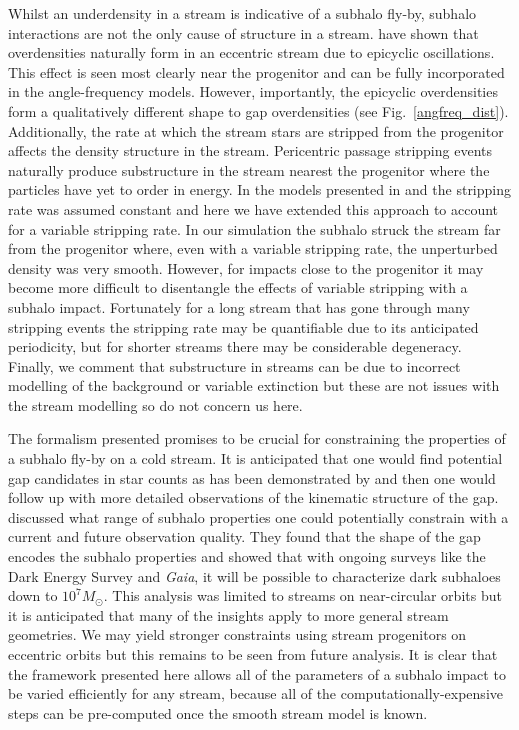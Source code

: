 \documentclass[useAMS,usenatbib,fleqn,a4paper]{mn2e}
\begin{document}
Whilst an underdensity in a stream is indicative of a subhalo fly-by, subhalo interactions are not the only cause of structure in a stream. \cite{Kuepper2010} have shown that overdensities naturally form in an eccentric stream due to epicyclic oscillations. This effect is seen most clearly near the progenitor and can be fully incorporated in the angle-frequency models. However, importantly, the epicyclic overdensities form a qualitatively different shape to gap overdensities (see Fig.~\ref{angfreq_dist}). Additionally, the rate at which the stream stars are stripped from the progenitor affects the density structure in the stream. Pericentric passage stripping events naturally produce substructure in the stream nearest the progenitor where the particles have yet to order in energy. In the models presented in \cite{Bovy2014} and \cite{Sanders2014} the stripping rate was assumed constant and here we have extended this approach to account for a variable stripping rate. In our simulation the subhalo struck the stream far from the progenitor where, even with a variable stripping rate, the unperturbed density was very smooth. However, for impacts close to the progenitor it may become more difficult to disentangle the effects of variable stripping with a subhalo impact. Fortunately for a long stream that has gone through many stripping events the stripping rate may be quantifiable due to its anticipated periodicity, but for shorter streams there may be considerable degeneracy. Finally, we comment that substructure in streams can be due to incorrect modelling of the background or variable extinction but these are not issues with the stream modelling so do not concern us here.

The formalism presented promises to be crucial for constraining the properties of a subhalo fly-by on a cold stream. It is anticipated that one would find potential gap candidates in star counts as has been demonstrated by \cite{CarlbergGD12013} and then one would follow up with more detailed observations of the kinematic structure of the gap. \cite{ErkalBelokurov2015b} discussed what range of subhalo properties one could potentially constrain with a current and future observation quality. They found that the shape of the gap encodes the subhalo properties and showed that with ongoing surveys like the Dark Energy Survey and \textit{Gaia}, it will be possible to characterize dark subhaloes down to $10^7M_\odot$. This analysis was limited to streams on near-circular orbits but it is anticipated that many of the insights apply to more general stream geometries. We may yield stronger constraints using stream progenitors on eccentric orbits but this remains to be seen from future analysis. It is clear that the framework presented here allows all of the parameters of a subhalo impact to be varied efficiently for any stream, because all of the computationally-expensive steps can be pre-computed once the smooth stream model is known.
\end{document}
